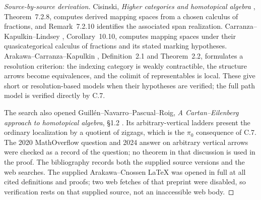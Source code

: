 \begin{proof}[Source-by-source derivation]
Cisinski, \emph{Higher categories and homotopical algebra} \cite{CpathsCisinski},
Theorem~7.2.8, computes derived mapping spaces from a chosen
calculus of fractions, and Remark~7.2.10 identifies the associated
span realization. Carranza--Kapulkin--Lindsey \cite{CpathsCarranzaKapulkinLindsey}, Corollary~10.10,
computes mapping spaces under their quasicategorical calculus of
fractions and its stated marking hypotheses. Arakawa--Carranza--Kapulkin \cite{CpathsArakawaCarranzaKapulkin},
Definition~2.1 and Theorem~2.2, formulates a resolution criterion:
the indexing category is weakly contractible, the structure arrows
become equivalences, and the colimit of representables is local.
These give short or resolution-based models when their hypotheses
are verified; the full path model is verified directly by C.7.

The search also opened Guill\'en--Navarro--Pascual--Roig,
\emph{A Cartan--Eilenberg approach to homotopical algebra},
\S1.2 \cite{CpathsGuillenEtAl}. Its arbitrary-vertical ladders present the ordinary
localization by a quotient of zigzags, which is the $\pi_0$
consequence of C.7. The 2020 MathOverflow question and 2024 answer
on arbitrary vertical arrows \cite{CpathsMathOverflow} were checked as a record of the
question; no theorem in that discussion is used in the proof.
The bibliography records both the supplied source versions and the
web searches. The supplied Arakawa--Cnossen LaTeX was opened in
full at all cited definitions and proofs; two web fetches of that
preprint were disabled, so verification rests on that supplied
source, not an inaccessible web body.
\end{proof}
